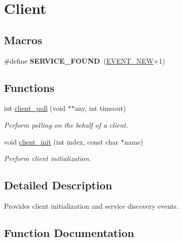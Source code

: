 \hypertarget{group__client}{}\section{Client}
\label{group__client}
\subsection*{Macros}
\begin{DoxyCompactItemize}
\item 
\mbox{\label{group__client_ga59d02ac70e666d153e0d9cb6374a19ac}} 
\#define {\bfseries S\+E\+R\+V\+I\+C\+E\+\_\+\+F\+O\+U\+ND}~(\hyperlink{group__event_gga2628ea8d12e8b2563c32f05dc7fff6faa747b63b45296ad40109256f1a3c93bb7}{E\+V\+E\+N\+T\+\_\+\+N\+EW}+1)
\end{DoxyCompactItemize}
\subsection*{Functions}
\begin{DoxyCompactItemize}
\item 
int \hyperlink{group__client_ga7c5c3327618a1b3c4757c415fb42ba8d}{client\+\_\+poll} (void $\ast$$\ast$any, int timeout)
\begin{DoxyCompactList}\small\item\em Perform polling on the behalf of a client. \end{DoxyCompactList}\item 
void \hyperlink{group__client_ga1309e49c4a65b13752f11098b765620e}{client\+\_\+init} (int index, const char $\ast$name)
\begin{DoxyCompactList}\small\item\em Perform client initialization. \end{DoxyCompactList}\end{DoxyCompactItemize}


\subsection{Detailed Description}
Provides client initialization and service discovery events. 

\subsection{Function Documentation}
\mbox{\label{group__client_ga1309e49c4a65b13752f11098b765620e}} 
